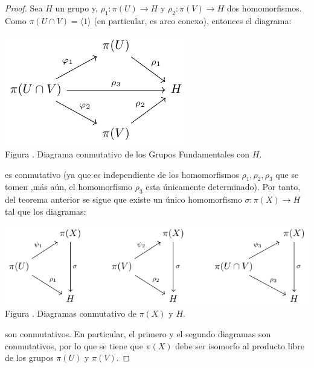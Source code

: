 \documentclass[12pt]{report}
\theoremstyle{largebreak}
\newcommand\cf[3]{\ensuremath{#1:#2\rightarrow#3}}
\newcounter{figcount}
\begin{document}
    \begin{proof}
        Sea $H$ un grupo y, $\cf{\rho_1}{\pi(U)}{H}$ y $\cf{\rho_2}{\pi(V)}{H}$ dos homomorfismos. Como $\pi(U\cap V)=\langle 1\rangle$ (en particular, es arco conexo), entonces el diagrama:

        \begin{minipage}{\textwidth}
            \begin{center}
                \includegraphics[scale=1.5]{images/fig_1.pdf}\\
                Figura \thefigcount. Diagrama conmutativo de los Grupos Fundamentales con $H$.
            \end{center}
        \end{minipage}

        es conmutativo (ya que es independiente de los homomorfismos $\rho_1,\rho_2,\rho_3$ que se tomen ,más aún, el homomorfismo $\rho_3$ esta únicamente determinado). Por tanto, del teorema anterior se sigue que existe un único homomorfismo $\cf{\sigma}{\pi(X)}{H}$ tal que los diagramas:

        \begin{minipage}{\textwidth}
            \begin{center}
                \includegraphics[scale=1.5]{images/fig_2.pdf}\\
                Figura \thefigcount. Diagramas conmutativo de $\pi(X)$ y $H$.
            \end{center}
        \end{minipage}

        son conmutativos. En particular, el primero y el segundo diagramas son conmutativos, por lo que se tiene que $\pi(X)$ debe ser isomorfo al producto libre de los grupos $\pi(U)$ y $\pi(V)$.
    \end{proof}
\end{document}
